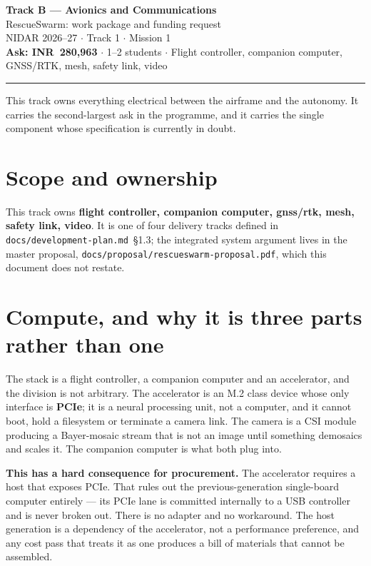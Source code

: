 \documentclass[11pt,a4paper]{article}
\newcommand{\inr}[1]{INR~#1}
\begin{document}
\begin{center}
{\LARGE\bfseries Track B --- Avionics and Communications}\\[3mm]
{\large RescueSwarm: work package and funding request}\\[2mm]
NIDAR 2026--27 $\cdot$ Track 1 $\cdot$ Mission 1\\[1mm]
\textbf{Ask: \inr{280,963}} $\cdot$ 1--2 students $\cdot$ Flight controller, companion computer, GNSS/RTK, mesh, safety link, video
\end{center}
\vspace{2mm}\hrule\vspace{4mm}


This track owns everything electrical between the airframe and the autonomy.
It carries the second-largest ask in the programme, and it carries the single
component whose specification is currently in doubt.

\section{Scope and ownership}

This track owns \textbf{flight controller, companion computer, gnss/rtk, mesh, safety link, video}. It is one of four delivery tracks defined in
\texttt{docs/development-plan.md}~\S1.3; the integrated system argument lives in
the master proposal, \texttt{docs/proposal/rescueswarm-proposal.pdf}, which this
document does not restate.

\section{Compute, and why it is three parts rather than one}

The stack is a flight controller, a companion computer and an accelerator, and
the division is not arbitrary. The accelerator is an M.2 class device whose only
interface is \textbf{PCIe}; it is a neural processing unit, not a computer, and
it cannot boot, hold a filesystem or terminate a camera link. The camera is a
CSI module producing a Bayer-mosaic stream that is not an image until something
demosaics and scales it. The companion computer is what both plug into.

\textbf{This has a hard consequence for procurement.} The accelerator requires a
host that exposes PCIe. That rules out the previous-generation single-board
computer entirely --- its PCIe lane is committed internally to a USB controller
and is never broken out. There is no adapter and no workaround. The host
generation is a dependency of the accelerator, not a performance preference,
and any cost pass that treats it as one produces a bill of materials that cannot
be assembled.
\end{document}
